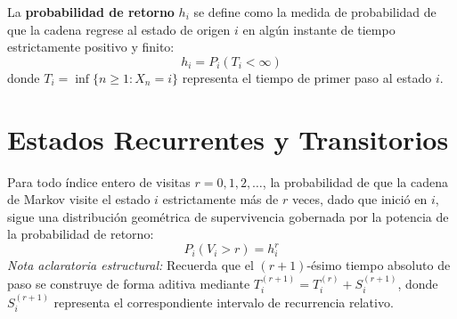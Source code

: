 \documentclass[10pt]{book}
\begin{document}
\begin{definicion}
    La \textbf{probabilidad de retorno} $h_i$ se define como la medida de probabilidad de que la cadena regrese al estado de origen $i$ en algún instante de tiempo estrictamente positivo y finito:
    \[
    h_i = P_i(T_i < \infty)
    \]
    donde $T_i = \inf\{n \geq 1 : X_n = i\}$ representa el tiempo de primer paso al estado $i$.
\end{definicion}


\section{Estados Recurrentes y Transitorios}

\begin{lema}
    Para todo índice entero de visitas $r = 0, 1, 2, \dots$, la probabilidad de que la cadena de Markov visite el estado $i$ estrictamente más de $r$ veces, dado que inició en $i$, sigue una distribución geométrica de supervivencia gobernada por la potencia de la probabilidad de retorno:
    \[
    P_i(V_i > r) = h_i^r
    \]
    \textit{Nota aclaratoria estructural:} Recuerda que el $(r+1)$-ésimo tiempo absoluto de paso se construye de forma aditiva mediante $T_i^{(r+1)} = T_i^{(r)} + S_i^{(r+1)}$, donde $S_i^{(r+1)}$ representa el correspondiente intervalo de recurrencia relativo.
\end{lema}
\end{document}
